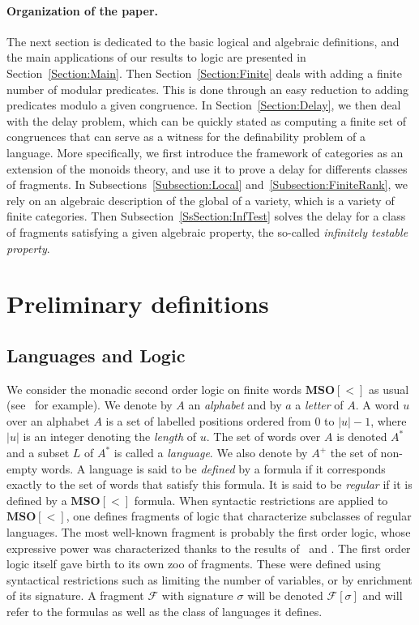 \documentclass[submission,hidelink]{dmtcs-episciences}
\newcommand{\cF}{\mathcal{F}}
\newcommand{\MSO}{\mathbf{MSO}}
\begin{document}
	\paragraph{Organization of the paper.}
	The next section is dedicated to the basic logical and algebraic definitions, and the main applications of our results to logic are presented in Section~\ref{Section:Main}.
	 Then Section~\ref{Section:Finite} deals with adding a finite number of modular predicates.
	 This is done through an easy reduction to adding predicates modulo a given congruence.
	 In Section~\ref{Section:Delay}, we then deal with the delay problem, which can be quickly stated as computing a finite set of congruences that can serve as a witness for the definability problem of a language.
	 More specifically, we first introduce the framework of categories as an extension of the monoids theory,
	 and use it to prove a delay for differents classes of fragments.
	 In Subsections~\ref{Subsection:Local} and~\ref{Subsection:FiniteRank}, we rely on an algebraic description of the global of a variety, which is a variety of finite categories.
	 Then Subsection~\ref{SsSection:InfTest} solves the delay for a class of fragments satisfying a given algebraic property, the so-called \emph{infinitely testable property}.

\section{Preliminary definitions}\label{Section:Defs}
	\subsection{Languages and Logic}
	We consider the monadic second order logic on finite words $\MSO[<]$ as usual
	(see~\cite{Straubing94} for example).
	We denote by $A$ an \emph{alphabet} and by $a$ a \emph{letter} of $A$.
	A word $u$ over an alphabet $A$ is a set of labelled positions ordered from $0$ to $|u|-1$, where $|u|$ is an integer denoting the \emph{length} of $u$.
	The set of words over $A$ is denoted $A^*$ and a subset $L$ of $A^*$ is called a \emph{language}.
	We also denote by $A^+$ the set of non-empty words.
	A language is said to be \emph{defined} by a formula if it corresponds exactly
	to the set of words that satisfy this formula.
	It is said to be \emph{regular} if it is defined by a $\MSO[<]$ formula.
	When syntactic restrictions are applied to $\MSO[<]$,
	one defines fragments of logic that characterize subclasses of regular languages.
	The most well-known fragment is probably the first order logic,
	whose expressive power was characterized
	thanks to the results of~\cite{MP71} and \cite{Schutzenberger65}.
	The first order logic itself gave birth to its own zoo of fragments.
	These were defined using syntactical restrictions such as limiting the number of variables,
	or by enrichment of its signature.
	A fragment $\cF$ with signature $\sigma$ will  be denoted $\cF[\sigma]$ and will refer to the formulas as well as the class of languages it
	defines.
\end{document}
